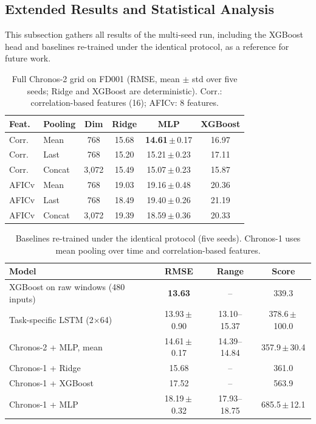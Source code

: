 \documentclass{svproc}
\begin{document}
\subsection{Extended Results and Statistical Analysis}

This subsection gathers all results of the multi-seed run, including the
XGBoost head and baselines re-trained under the identical protocol, as a
reference for future work.

\begin{table}[h]
\caption{Full Chronos-2 grid on FD001 (RMSE, mean $\pm$ std over five seeds;
Ridge and XGBoost are deterministic). Corr.: correlation-based features (16);
AFICv: 8 features.}
\label{tab:fullgrid}
\centering\small
\begin{tabular}{@{}llcccc@{}}
\toprule
\textbf{Feat.} & \textbf{Pooling} & \textbf{Dim} & \textbf{Ridge} & \textbf{MLP} & \textbf{XGBoost} \\
\midrule
Corr.  & Mean   & 768   & 15.68 & \textbf{14.61}\,$\pm$\,0.17 & 16.97 \\
Corr.  & Last   & 768   & 15.20 & 15.21\,$\pm$\,0.23 & 17.11 \\
Corr.  & Concat & 3,072 & 15.49 & 15.07\,$\pm$\,0.23 & 15.87 \\
\midrule
AFICv  & Mean   & 768   & 19.03 & 19.16\,$\pm$\,0.48 & 20.36 \\
AFICv  & Last   & 768   & 18.49 & 19.40\,$\pm$\,0.26 & 21.19 \\
AFICv  & Concat & 3,072 & 19.39 & 18.59\,$\pm$\,0.36 & 20.33 \\
\bottomrule
\end{tabular}
\end{table}

\begin{table}[h]
\caption{Baselines re-trained under the identical protocol (five seeds).
Chronos-1 uses mean pooling over time and correlation-based features.}
\label{tab:rerun}
\centering\small
\begin{tabular}{@{}lccc@{}}
\toprule
\textbf{Model} & \textbf{RMSE} & \textbf{Range} & \textbf{Score} \\
\midrule
XGBoost on raw windows (480 inputs) & \textbf{13.63} & -- & 339.3 \\
Task-specific LSTM (2$\times$64)    & 13.93\,$\pm$\,0.90 & 13.10--15.37 & 378.6\,$\pm$\,100.0 \\
Chronos-2 + MLP, mean               & 14.61\,$\pm$\,0.17 & 14.39--14.84 & 357.9\,$\pm$\,30.4 \\
Chronos-1 + Ridge                   & 15.68 & -- & 361.0 \\
Chronos-1 + XGBoost                 & 17.52 & -- & 563.9 \\
Chronos-1 + MLP                     & 18.19\,$\pm$\,0.32 & 17.93--18.75 & 685.5\,$\pm$\,12.1 \\
\bottomrule
\end{tabular}
\end{table}
\end{document}
